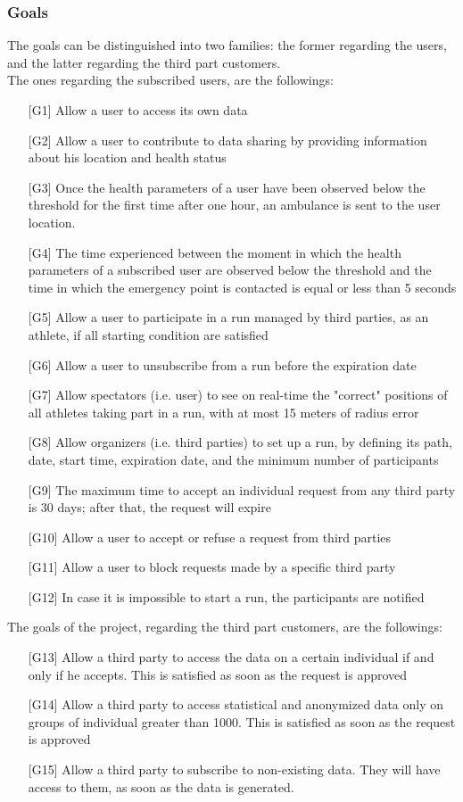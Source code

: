 \subsubsection{Goals}
The goals can be distinguished into two families: the former regarding the users, and the latter regarding the third part customers.\\
The ones regarding the subscribed users, are the followings:
\begin{enumerate}
\item[{[G1]}] Allow a user to access its own data
\item[{[G2]}] Allow a user to contribute to data sharing by providing information about his location and health status
\item[{[G3]}] Once the health parameters of a user have been observed 
below the threshold for the first time after one hour, an ambulance is sent to the user location. 
\item[{[G4]}] The time experienced between the moment in which the health parameters of a subscribed user are observed below the threshold and the time in which the emergency point is contacted is equal or less than 5 seconds
\item[{[G5]}] Allow a user to participate in a run managed by third parties, as an athlete, if all starting condition are satisfied
\item[{[G6]}] Allow a user to unsubscribe from a run before the expiration date
\item[{[G7]}] Allow spectators (i.e. user) to see on real-time the "correct" positions of all athletes taking part in a run, with at most 15 meters of radius error
\item[{[G8]}] Allow organizers (i.e. third parties) to set up a run, by defining its path, date, start time, expiration date, and the minimum number of participants
\item[{[G9]}] The maximum time to accept an individual request from any third party is 30 days; after that, the request will expire
\item[{[G10]}] Allow a user to accept or refuse a request from third parties
\item[{[G11]}] Allow a user to block requests made by a specific third party
\item[{[G12]}] In case it is impossible to start a run, the participants are notified
\end{enumerate}
The goals of the project, regarding the third part customers, are the followings:
\begin{enumerate}
\item[{[G13]}] Allow a third party to access the data on a certain individual if and only if he accepts. This is satisfied as soon as the request is approved
\item[{[G14]}] Allow a third party to access statistical and anonymized data only on groups of individual greater than 1000. This is satisfied as soon as the request is approved
\item[{[G15]}] Allow a third party to subscribe to non-existing data. They will have access to them, as soon as the data is generated. 
\end{enumerate}
